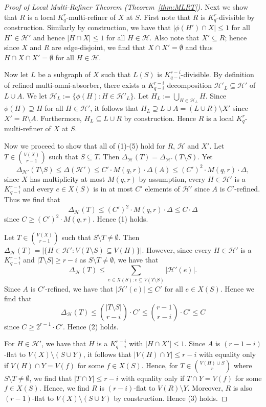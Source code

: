 \documentclass[11pt]{article}
\newcounter{i}
\theoremstyle{plain}
\theoremstyle{plain} %
\theoremstyle{definition}
\begin{document}
\begin{proof}[Proof of Local Multi-Refiner Theorem (Theorem~\ref{thm:MLRT})]
Next we show that $R$ is a local $K_q^r$-multi-refiner of $X$ at $S$. First note that $R$ is $K_q^r$-divisible by construction. Similarly by construction, we have that $|\phi(H')\cap X|\le 1$ for all $H'\in \mathcal{H}'$ and hence $|H\cap X|\le 1$ for all $H\in \mathcal{H}$. Also note that $X'\subseteq R$; hence since $X$ and $R$ are edge-disjoint, we find that $X\cap X'=\emptyset$ and thus $H\cap X\cap X'=\emptyset$ for all $H\in \mathcal{H}$.

Now let $L$ be a subgraph of $X$ such that $L(S)$ is $K_{q-i}^{r-i}$-divisible. By definition of refined multi-omni-absorber, there exists a $K_{q-i}^{r-i}$ decomposition $\mathcal{H}'_L \subseteq \mathcal{H}'$ of $L\cup A$. We let $\mathcal{H}_L := \{ \phi(H): H\in \mathcal{H}'_L\}$. Let $H_L := \bigcup_{H\in \mathcal{H}_L} H$. Since $\phi(H)\supseteq H$ for all $H\in\mathcal{H}'$, it follows that $H_L \supseteq L\cup A = (L\cup R)\setminus X'$ since $X' = R\setminus A$. Furthermore, $H_L \subseteq L\cup R$ by construction. Hence $R$ is a local $K_q^r$-multi-refiner of $X$ at $S$.

Now we proceed to show that all of (1)-(5) hold for $R$, $\mathcal{H}$ and $X'$. Let $T\in \binom{V(X)}{r-1}$ such that $S\subseteq T$. Then 
$\Delta_{\mathcal{H}}(T) = \Delta_{\mathcal{H'}}(T\setminus S)$. Yet 
$$\Delta_{\mathcal{H'}}(T\setminus S) \le \Delta(\mathcal{H}')\le C'\cdot M(q,r)\cdot \Delta(A) \le (C')^2 \cdot M(q,r)\cdot \Delta,$$ 
since $X$ has multiplicity at most $M(q,r)$ by assumption, every $H\in\mathcal{H}'$ is a $K_{q-i}^{r-i}$ and every $e\in X(S)$ is in at most $C'$ elements of $\mathcal{H}'$ since $A$ is $C'$-refined. Thus we find that
$$\Delta_{\mathcal{H}}(T) \le (C')^2 \cdot M(q,r)\cdot \Delta \le C\cdot \Delta$$
since $C\ge (C')^2\cdot M(q,r)$. Hence (1) holds. 

Let $T\in \binom{V(X)}{r-1}$ such that $S\setminus T \ne \emptyset$. Then $\Delta_{\mathcal{H}}(T) = |\{H\in\mathcal{H}': V(T\setminus S) \subseteq V(H)\}|$. However, since every $H\in\mathcal{H}'$ is a $K_{q-i}^{r-i}$ and $|T\setminus S|\ge r-i$ as $S\setminus T\ne \emptyset$, we have that  
$$\Delta_{\mathcal{H}}(T)\le \sum_{e\in X(S): e \subseteq V(T\setminus S)}  |\mathcal{H}'(e)|.$$ 
Since $A$ is $C'$-refined, we have that $|\mathcal{H}'(e)|\le C'$ for all $e\in X(S)$. Hence we find that
$$\Delta_{\mathcal{H}}(T) \le \binom{|T\setminus S|}{r-i} \cdot C' \le \binom{r-1}{r-i}\cdot C'\le C$$
since $C \ge 2^{r-1}\cdot C'$. Hence (2) holds.

For $H\in \mathcal{H}'$, we have that $H$ is a $K_{q-i}^{r-i}$ with $|H\cap X'|\le 1$. Since $A$ is $(r-1-i)$-flat to $V(X)\setminus (S\cup Y)$, it follows that $|V(H)\cap Y|\le r-i$ with equality only if $V(H)\cap Y = V(f)$ for some $f\in X(S)$. Hence, for $T \in \binom{V(H)\cup S}{r}$ where $S\setminus T\ne \emptyset$, we find that $|T\cap Y|\le r-i$ with equality only if $T\cap Y = V(f)$ for some $f\in X(S)$. Hence, we find $R$ is $(r-i)$-flat to $V(R)\setminus Y$. Moreover, $R$ is also $(r-1)$-flat to $V(X)\setminus (S\cup Y)$ by construction. Hence (3) holds. 


\end{proof}
\end{document}

